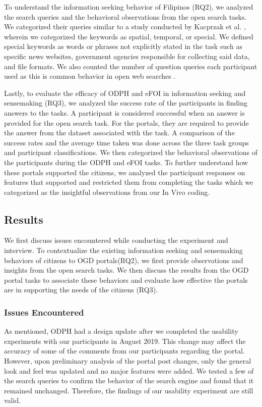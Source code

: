 \documentclass{sigchi}
\begin{document}
To understand the information seeking behavior of Filipinos (RQ2), we analyzed the search queries and the behavioral observations from the open search tasks. We categorized their queries similar to a study conducted by Kacprzak et al. \cite{kacprzak2019characterising}, wherein we categorized the keywords as spatial, temporal, or special. We defined special keywords as words or phrases not explicitly stated in the task such as specific news websites, government agencies responsible for collecting said data, and file formats. We also counted the number of question queries each participant used as this is common behavior in open web searches \cite{White2015}.

Lastly, to evaluate the efficacy of ODPH and eFOI in information seeking and sensemaking (RQ3), we analyzed the success rate of the participants in finding answers to the tasks. A participant is considered successful when an answer is provided for the open search task. For the portals, they are required to provide the answer from the dataset associated with the task. A comparison of the success rates and the average time taken was done across the three task groups and participant classifications. We then categorized the behavioral observations of the participants during the ODPH and eFOI tasks. To further understand how these portals supported the citizens, we analyzed the participant responses on features that supported and restricted them from completing the tasks which we categorized as the insightful observations from our In Vivo coding. 

\subsection{Results}
We first discuss issues encountered while conducting the experiment and interview. To contextualize the existing information seeking and sensemaking behaviors of citizens to OGD portals(RQ2), we first provide observations and insights from the open search tasks. We then discuss the results from the OGD portal tasks to associate these behaviors and evaluate how effective the portals are in supporting the needs of the citizens (RQ3).


\subsubsection{Issues Encountered}
As mentioned, ODPH had a design update after we completed the usability experiments with our participants in August 2019. This change may affect the accuracy of some of the comments from our participants regarding the portal. However, upon preliminary analysis of the portal post changes, only the general look and feel was updated and no major features were added. We tested a few of the search queries to confirm the behavior of the search engine and found that it remained unchanged. Therefore, the findings of our usability experiment are still valid.
\end{document}
